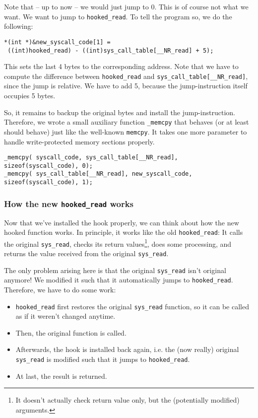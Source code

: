 \documentclass[10pt, letterpaper]{article}
\begin{document}
Note that -- up to now -- we would just jump to 0. This is of course not what we want. We want to jump to \texttt{hooked\_read}. To tell the program so, we do the following:

\begin{verbatim}
*(int *)&new_syscall_code[1] = 
 ((int)hooked_read) - ((int)sys_call_table[__NR_read] + 5);
\end{verbatim}

This sets the last 4 bytes to the corresponding address. Note that we have to compute the difference between \texttt{hooked\_read} and \texttt{sys\_call\_table[\_\_NR\_read]}, since the jump is relative. We have to add 5, because the jump-instruction itself occupies 5 bytes.

So, it remains to backup the original bytes and install the jump-instruction. Therefore, we wrote a small auxiliary function \texttt{\_memcpy} that behaves (or at least should behave) just like the well-known \texttt{memcpy}. It takes one more parameter to handle write-protected memory sections properly.

\begin{verbatim}
_memcpy( syscall_code, sys_call_table[__NR_read], sizeof(syscall_code), 0);
_memcpy( sys_call_table[__NR_read], new_syscall_code, sizeof(syscall_code), 1);
\end{verbatim}

\subsubsection{How the new \texttt{hooked\_read} works}
\label{sec:hooked-read-2-technique}

Now that we've installed the hook properly, we can think about how the new hooked function works. In principle, it works like the old \texttt{hooked\_read}: It calls the original \texttt{sys\_read}, checks its return values\footnote{It doesn't actually check return value only, but the (potentially modified) arguments.}, does some processing, and returns the value received from the original \texttt{sys\_read}.

The only problem arising here is that the original \texttt{sys\_read} isn't original anymore! We modified it such that it automatically jumps to \texttt{hooked\_read}. Therefore, we have to do some work: 

\begin{itemize}
\item \texttt{hooked\_read} first restores the original \texttt{sys\_read} function, so it can be called as if it weren't changed anytime.
\item Then, the original function is called.
\item Afterwards, the hook is installed back again, i.e. the (now really) original \texttt{sys\_read} is modified such that it jumps to \texttt{hooked\_read}.
\item At last, the result is returned.
\end{itemize}
\end{document}
